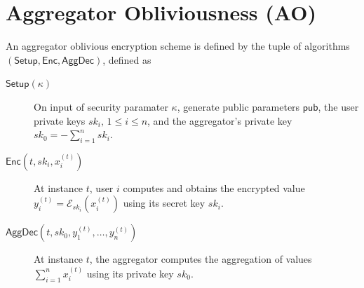 \documentclass[twocolumn]{autart}
\begin{document}
\section{Aggregator Obliviousness (AO)} \label{app:ao}
An aggregator oblivious encryption scheme is defined by the tuple of algorithms $(\mathsf{Setup}, \mathsf{Enc}, \mathsf{AggDec})$, defined as
\begin{description}
    \item[$\mathsf{Setup}(\kappa)$] On input of security paramater $\kappa$, generate public parameters $\mathsf{pub}$, the user private keys $sk_i,\,1\leq i \leq n$, and the aggregator's private key $sk_0=-\sum^n_{i=1}sk_i$.
    \item[$\mathsf{Enc}(t, sk_i, x^{(t)}_i)$] At instance $t$, user $i$ computes and obtains the encrypted value $y^{(t)}_i = \mathcal{E}_{sk_i}(x^{(t)}_i)$ using its secret key $sk_i$.
    \item[$\mathsf{AggDec}(t, sk_0, y^{(t)}_1,\dots,y^{(t)}_n)$] At instance $t$, the aggregator computes the aggregation of values $\sum^{n}_{i=1} x^{(t)}_i$ using its private key $sk_0$.
\end{description}
\end{document}
